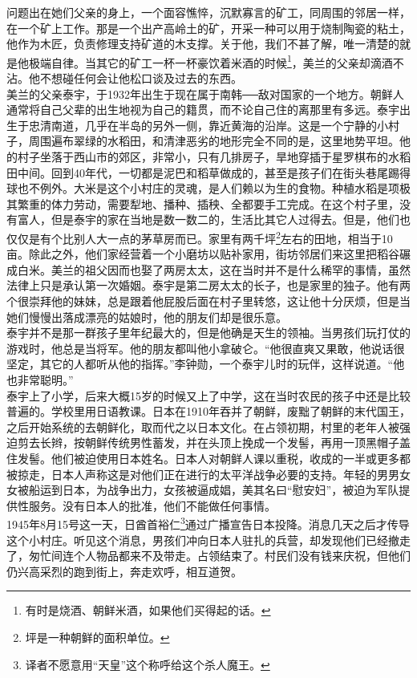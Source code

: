 问题出在她们父亲的身上，一个面容憔悴，沉默寡言的矿工，同周围的邻居一样，在一个矿上工作。那是一个出产高岭土的矿，开采一种可以用于烧制陶瓷的粘土，他作为木匠，负责修理支持矿道的木支撑。关于他，我们不甚了解，唯一清楚的就是他极端自律。当其它的矿工一杯一杯豪饮着米酒的时候\footnote{有时是烧酒、朝鲜米酒，如果他们买得起的话。}，美兰的父亲却滴酒不沾。他不想碰任何会让他松口谈及过去的东西。\\

美兰的父亲泰宇，于1932年出生于现在属于南韩──敌对国家的一个地方。朝鲜人通常将自己父辈的出生地视为自己的籍贯，而不论自己住的离那里有多远。泰宇出生于忠清南道，几乎在半岛的另外一侧，靠近黄海的沿岸。这是一个宁静的小村子，周围遍布翠绿的水稻田，和清津恶劣的地形完全不同的是，这里地势平坦。他的村子坐落于西山市的郊区，非常小，只有几排房子，旱地穿插于星罗棋布的水稻田中间。回到40年代，一切都是泥巴和稻草做成的，甚至是孩子们在街头巷尾踢得球也不例外。大米是这个小村庄的灵魂，是人们赖以为生的食物。种植水稻是项极其繁重的体力劳动，需要犁地、播种、插秧、全都要手工完成。在这个村子里，没有富人，但是泰宇的家在当地是数一数二的，生活比其它人过得去。但是，他们也仅仅是有个比别人大一点的茅草房而已。家里有两千坪\footnote{坪是一种朝鲜的面积单位。}左右的田地，相当于10亩。除此之外，他们家经营着一个小磨坊以贴补家用，街坊邻居们来这里把稻谷碾成白米。美兰的祖父因而也娶了两房太太，这在当时并不是什么稀罕的事情，虽然法律上只是承认第一次婚姻。泰宇是第二房太太的长子，也是家里的独子。他有两个很崇拜他的妹妹，总是跟着他屁股后面在村子里转悠，这让他十分厌烦，但是当她们慢慢出落成漂亮的姑娘时，他的朋友们却是很乐意。\\

泰宇并不是那一群孩子里年纪最大的，但是他确是天生的领袖。当男孩们玩打仗的游戏时，他总是当将军。他的朋友都叫他小拿破仑。“他很直爽又果敢，他说话很坚定，其它的人都听从他的指挥。”李钟勋，一个泰宇儿时的玩伴，这样说道。“他也非常聪明。”\\

泰宇上了小学，后来大概15岁的时候又上了中学，这在当时农民的孩子中还是比较普遍的。学校里用日语教课。日本在1910年吞并了朝鲜，废黜了朝鲜的末代国王，之后开始系统的去朝鲜化，取而代之以日本文化。在占领初期，村里的老年人被强迫剪去长辫，按朝鲜传统男性蓄发，并在头顶上挽成一个发髻，再用一顶黑帽子盖住发髻。他们被迫使用日本姓名。日本人对朝鲜人课以重税，收成的一半或更多都被掠走，日本人声称这是对他们正在进行的太平洋战争必要的支持。年轻的男男女女被船运到日本，为战争出力，女孩被逼成娼，美其名曰“慰安妇”，被迫为军队提供性服务。没有日本人的批准，他们不能做任何事情。\\

1945年8月15号这一天，日酋首裕仁\footnote{译者不愿意用“天皇”这个称呼给这个杀人魔王。}通过广播宣告日本投降。消息几天之后才传导这个小村庄。听见这个消息，男孩们冲向日本人驻扎的兵营，却发现他们已经撤走了，匆忙间连个人物品都来不及带走。占领结束了。村民们没有钱来庆祝，但他们仍兴高采烈的跑到街上，奔走欢呼，相互道贺。\\

